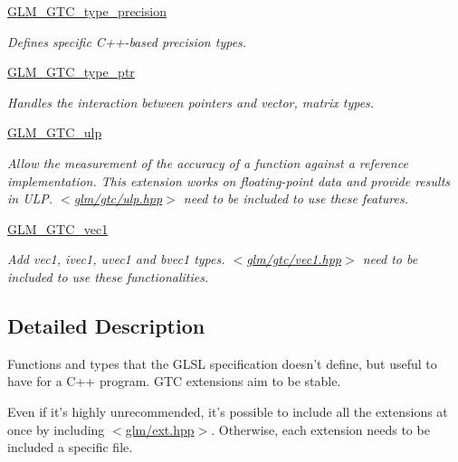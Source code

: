 \begin{DoxyCompactItemize}
\hyperlink{group__gtc__type__precision}{G\-L\-M\-\_\-\-G\-T\-C\-\_\-type\-\_\-precision}
\begin{DoxyCompactList}\small\item\em Defines specific C++-\/based precision types. \end{DoxyCompactList}\item 
\hyperlink{group__gtc__type__ptr}{G\-L\-M\-\_\-\-G\-T\-C\-\_\-type\-\_\-ptr}
\begin{DoxyCompactList}\small\item\em Handles the interaction between pointers and vector, matrix types. \end{DoxyCompactList}\item 
\hyperlink{group__gtc__ulp}{G\-L\-M\-\_\-\-G\-T\-C\-\_\-ulp}
\begin{DoxyCompactList}\small\item\em Allow the measurement of the accuracy of a function against a reference implementation. This extension works on floating-\/point data and provide results in U\-L\-P. $<$\hyperlink{ulp_8hpp}{glm/gtc/ulp.\-hpp}$>$ need to be included to use these features. \end{DoxyCompactList}\item 
\hyperlink{group__gtc__vec1}{G\-L\-M\-\_\-\-G\-T\-C\-\_\-vec1}
\begin{DoxyCompactList}\small\item\em Add vec1, ivec1, uvec1 and bvec1 types. $<$\hyperlink{vec1_8hpp}{glm/gtc/vec1.\-hpp}$>$ need to be included to use these functionalities. \end{DoxyCompactList}\end{DoxyCompactItemize}


\subsection{Detailed Description}
Functions and types that the G\-L\-S\-L specification doesn't define, but useful to have for a C++ program. G\-T\-C extensions aim to be stable.

Even if it's highly unrecommended, it's possible to include all the extensions at once by including $<$\hyperlink{ext_8hpp_source}{glm/ext.\-hpp}$>$. Otherwise, each extension needs to be included a specific file. 